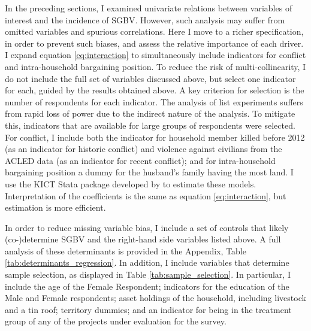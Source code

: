 In the preceding sections, I examined univariate relations between variables of interest and the incidence of SGBV. However, such analysis may suffer from omitted variables and spurious correlations. Here I move to a richer specification, in order to prevent such biases, and assess the relative importance of each driver. I expand equation \ref{eq:interaction} to simultaneously include indicators for conflict and intra-household bargaining position. To reduce the risk of multi-collinearity, I do not include the full set of variables discussed above, but select one indicator for each, guided by the results obtained above. A key criterion for selection is the number of respondents for each indicator. The analysis of list experiments suffers from rapid loss of power due to the indirect nature of the analysis. To mitigate this, indicators that are available for large groups of respondents were selected. For conflict, I include both the indicator for household member killed before 2012 (as an indicator for historic conflict) and violence against civilians from the ACLED data (as an indicator for recent conflict); and for intra-household bargaining position a dummy for the husband's family having the most land. I use the KICT Stata package developed by \citet{Tsai2019} to estimate these models. Interpretation of the coefficients is the same as equation \ref{eq:interaction}, but estimation is more efficient.

In order to reduce missing variable bias, I include a set of controls that likely (co-)determine SGBV and the right-hand side variables listed above. A full analysis of these determinants is provided in the Appendix, Table \ref{tab:determinants_regression}. In addition, I include variables that determine sample selection, as displayed in Table \ref{tab:sample_selection}. In particular, I include the age of the Female Respondent; indicators for the education of the Male and Female respondents; asset holdings of the household, including livestock and a tin roof; territory dummies; and an indicator for being in the treatment group of any of the projects under evaluation for the survey.

